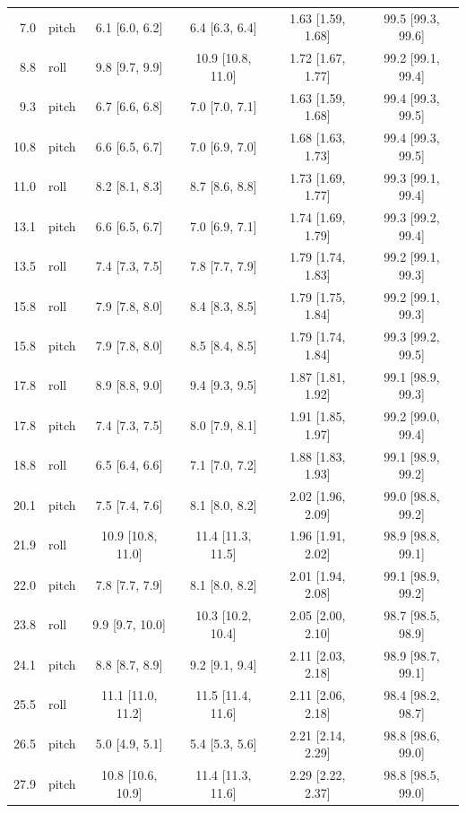 \begin{table}[H]
\begin{tabular}{r l *{4}{c}}
		7.0 & pitch & 6.1 [6.0, 6.2] & 6.4 [6.3, 6.4] & 1.63 [1.59, 1.68] & 99.5 [99.3, 99.6] \\
		8.8 & roll & 9.8 [9.7, 9.9] & 10.9 [10.8, 11.0] & 1.72 [1.67, 1.77] & 99.2 [99.1, 99.4] \\
		9.3 & pitch & 6.7 [6.6, 6.8] & 7.0 [7.0, 7.1] & 1.63 [1.59, 1.68] & 99.4 [99.3, 99.5] \\
		10.8 & pitch & 6.6 [6.5, 6.7] & 7.0 [6.9, 7.0] & 1.68 [1.63, 1.73] & 99.4 [99.3, 99.5] \\
		11.0 & roll & 8.2 [8.1, 8.3] & 8.7 [8.6, 8.8] & 1.73 [1.69, 1.77] & 99.3 [99.1, 99.4] \\
		13.1 & pitch & 6.6 [6.5, 6.7] & 7.0 [6.9, 7.1] & 1.74 [1.69, 1.79] & 99.3 [99.2, 99.4] \\
		13.5 & roll & 7.4 [7.3, 7.5] & 7.8 [7.7, 7.9] & 1.79 [1.74, 1.83] & 99.2 [99.1, 99.3] \\
		15.8 & roll & 7.9 [7.8, 8.0] & 8.4 [8.3, 8.5] & 1.79 [1.75, 1.84] & 99.2 [99.1, 99.3] \\
		15.8 & pitch & 7.9 [7.8, 8.0] & 8.5 [8.4, 8.5] & 1.79 [1.74, 1.84] & 99.3 [99.2, 99.5] \\
		17.8 & roll & 8.9 [8.8, 9.0] & 9.4 [9.3, 9.5] & 1.87 [1.81, 1.92] & 99.1 [98.9, 99.3] \\
		17.8 & pitch & 7.4 [7.3, 7.5] & 8.0 [7.9, 8.1] & 1.91 [1.85, 1.97] & 99.2 [99.0, 99.4] \\
		18.8 & roll & 6.5 [6.4, 6.6] & 7.1 [7.0, 7.2] & 1.88 [1.83, 1.93] & 99.1 [98.9, 99.2] \\
		20.1 & pitch & 7.5 [7.4, 7.6] & 8.1 [8.0, 8.2] & 2.02 [1.96, 2.09] & 99.0 [98.8, 99.2] \\
		21.9 & roll & 10.9 [10.8, 11.0] & 11.4 [11.3, 11.5] & 1.96 [1.91, 2.02] & 98.9 [98.8, 99.1] \\
		22.0 & pitch & 7.8 [7.7, 7.9] & 8.1 [8.0, 8.2] & 2.01 [1.94, 2.08] & 99.1 [98.9, 99.2] \\
		23.8 & roll & 9.9 [9.7, 10.0] & 10.3 [10.2, 10.4] & 2.05 [2.00, 2.10] & 98.7 [98.5, 98.9] \\
		24.1 & pitch & 8.8 [8.7, 8.9] & 9.2 [9.1, 9.4] & 2.11 [2.03, 2.18] & 98.9 [98.7, 99.1] \\
		25.5 & roll & 11.1 [11.0, 11.2] & 11.5 [11.4, 11.6] & 2.11 [2.06, 2.18] & 98.4 [98.2, 98.7] \\
		26.5 & pitch & 5.0 [4.9, 5.1] & 5.4 [5.3, 5.6] & 2.21 [2.14, 2.29] & 98.8 [98.6, 99.0] \\
		27.9 & pitch & 10.8 [10.6, 10.9] & 11.4 [11.3, 11.6] & 2.29 [2.22, 2.37] & 98.8 [98.5, 99.0] \\
		\bottomrule
	\end{tabular}
\end{table}
